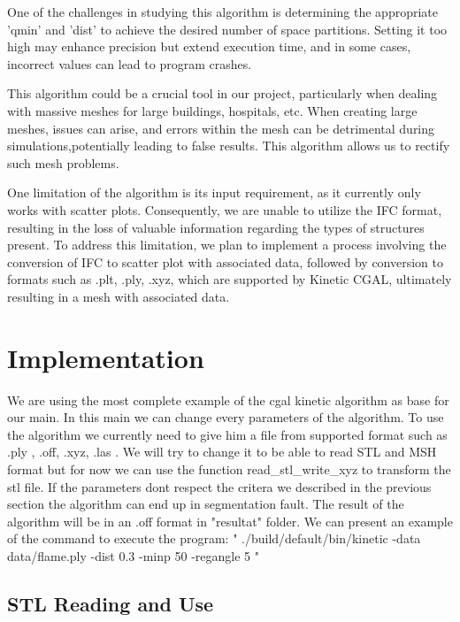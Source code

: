 \documentclass{article}
\begin{document}
  One of the challenges in studying this algorithm is determining the appropriate 'qmin' and 'dist' to achieve the desired number of space partitions.
  Setting it too high may enhance precision but extend execution time, and in some cases, incorrect values can lead to program crashes.

This algorithm could be a crucial tool in our project, particularly when dealing with massive meshes for large buildings,
hospitals, etc. When creating large meshes, issues can arise, and errors within the mesh can be detrimental during simulations,potentially leading to false results. 
This algorithm allows us to rectify such mesh problems.

One limitation of the algorithm is its input requirement, as it currently only works with scatter plots. Consequently, we are unable to utilize the IFC format, 
resulting in the loss of valuable information regarding the types of structures present. To address this limitation, 
we plan to implement a process involving the conversion of IFC to scatter plot with associated data, followed by conversion to formats such as .plt, .ply, .xyz,
which are supported by Kinetic CGAL, ultimately resulting in a mesh with associated data.


\section{Implementation}

We are using the most complete example of the cgal kinetic algorithm as base for our main. In this main we can change every parameters of the algorithm.
\newline
To use the algorithm we currently need to give him a file from supported format such as .ply , .off, .xyz, .las .
We will try to change it to be able to read STL and MSH format but for now we can use the function read\_stl\_write\_xyz to transform the stl file.
If the parameters dont respect the critera we described in the previous section the algorithm can end up in segmentation fault.
The result of the algorithm will be in an .off format in "resultat" folder.
\newline
We can present an example of the command to execute the program:
\newline
" ./build/default/bin/kinetic -data data/flame.ply -dist 0.3 -minp 50 -regangle 5 "
\newline


\subsection{STL Reading and Use}
\end{document}
